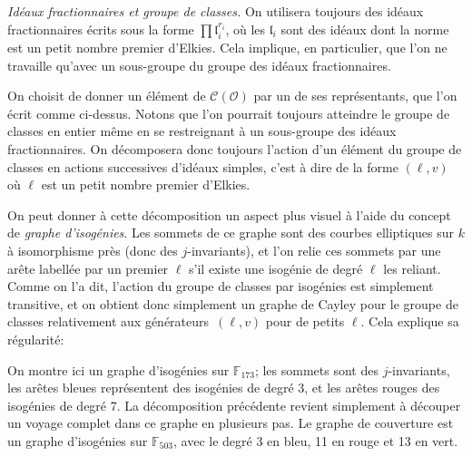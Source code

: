 \documentclass[11pt,a4paper]{article}
\newcommand{\F}{\mathbb{F}}
\renewcommand{\O}{\mathcal{O}}
\newcommand{\Cl}{\mathcal{C}}
\renewcommand{\frak}{\mathfrak}
\renewcommand{\v}{\vspace{5mm}}
\theoremstyle{definition}
\begin{document}
\emph{Idéaux fractionnaires et groupe de classes.} On utilisera toujours des idéaux fractionnaires écrits sous la forme $\prod {\frak l}_i^{r_i}$, où les ${\frak l}_i$ sont des idéaux dont la norme est un petit nombre premier d'Elkies. Cela implique, en particulier, que l'on ne travaille qu'avec un sous-groupe du groupe des idéaux fractionnaires.

On choisit de donner un élément de $\Cl(\O)$ par un de ses représentants, que l'on écrit comme ci-dessus. Notons que l'on pourrait toujours atteindre le groupe de classes en entier même en se restreignant à un sous-groupe des idéaux fractionnaires. On décomposera donc toujours l'action d'un élément du groupe de classes en actions successives d'idéaux \og simples\fg, c'est à dire de la forme $(\ell, v)$ où $\ell$ est un petit nombre premier d'Elkies.

On peut donner à cette décomposition un aspect plus visuel à l'aide du concept de \emph{graphe d'isogénies}. Les sommets de ce graphe sont des courbes elliptiques sur $k$ à isomorphisme près (donc des $j$-invariants), et l'on relie ces sommets par une arête labellée par un premier $\ell$ s'il existe une isogénie de degré $\ell$ les reliant. Comme on l'a dit, l'action du groupe de classes par isogénies est simplement transitive, et on obtient donc simplement un graphe de Cayley pour le groupe de classes relativement aux \og générateurs\fg\ $(\ell, v)$ pour de petits $\ell$. Cela explique sa régularité:

\begin{center}
\end{center}


On montre ici un graphe d'isogénies sur $\F_{173}$; les sommets sont des $j$-invariants, les arêtes bleues représentent des isogénies de degré 3, et les arêtes rouges des isogénies de degré 7. La décomposition précédente revient simplement à découper un voyage complet dans ce graphe en plusieurs pas. Le graphe de couverture est un graphe d'isogénies sur $\F_{503}$, avec le degré 3 en bleu, 11 en rouge et 13 en vert. 
\v
\end{document}
